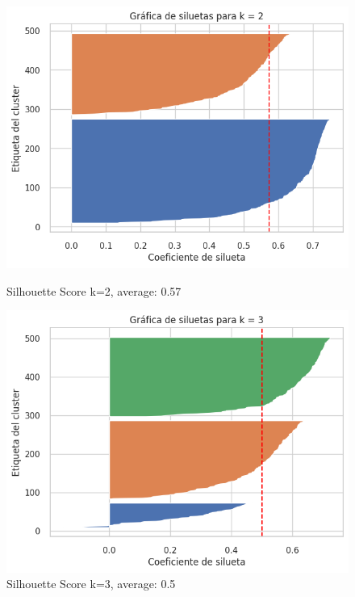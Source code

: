 \documentclass{article}
\begin{document}
\begin{figure}[H]
	\centering
	\begin{minipage}{0.45\textwidth}
		\centering
		\includegraphics[width=\textwidth]{images/sil_2.png}
		\caption{Silhouette Score k=2, average: 0.57}
		\label{fig:sil2}
	\end{minipage}\hfill
	\begin{minipage}{0.45\textwidth}
		\centering
		\includegraphics[width=\textwidth]{images/sil_3.png}
		\caption{Silhouette Score k=3, average: 0.5}
		\label{fig:sil3}
	\end{minipage}
	
	\vspace{0.5cm} %
	

\end{figure}
\end{document}
